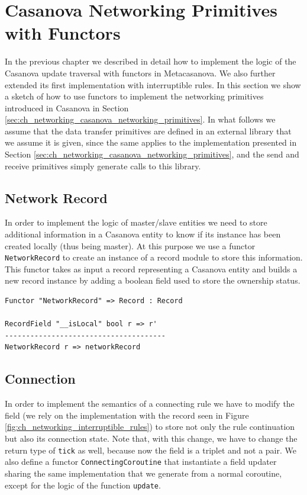 \section{Casanova Networking Primitives with Functors}
\label{sec:ch_networking_functor_networking}
In the previous chapter we described in detail how to implement the logic of the Casanova update traversal with functors in Metacasanova. We also further extended its first implementation with interruptible rules. In this section we show a sketch of how to use functors to implement the networking primitives introduced in Casanova in Section \ref{sec:ch_networking_casanova_networking_primitives}. In what follows we assume that the data transfer primitives are defined in an external library that we assume it is given, since the same applies to the implementation presented in Section \ref{sec:ch_networking_casanova_networking_primitives}, and the send and receive primitives simply generate calls to this library.

\subsection{Network Record}
\label{subsec:ch_networking_network_record}
In order to implement the logic of master/slave entities we need to store additional information in a Casanova entity to know if its instance has been created locally (thus being master). At this purpose we use a functor \texttt{NetworkRecord} to create an instance of a record module to store this information. This functor takes as input a record representing a Casanova entity and builds a new record instance by adding a boolean field used to store the ownership status.

\begin{lstlisting}
Functor "NetworkRecord" => Record : Record 

RecordField "__isLocal" bool r => r'
--------------------------------------
NetworkRecord r => networkRecord
\end{lstlisting}

\subsection{Connection}
\label{subsec:ch_networking_connection}
In order to implement the semantics of a connecting rule we have to modify the field (we rely on the implementation with the record seen in Figure \ref{fig:ch_networking_interruptible_rules}) to store not only the rule continuation but also its connection state. Note that, with this change, we have to change the return type of \texttt{tick} as well, because now the field is a triplet and not a pair. We also define a functor \texttt{ConnectingCoroutine} that instantiate a field updater sharing the same implementation that we generate from a normal coroutine, except for the logic of the function \texttt{update}. 

